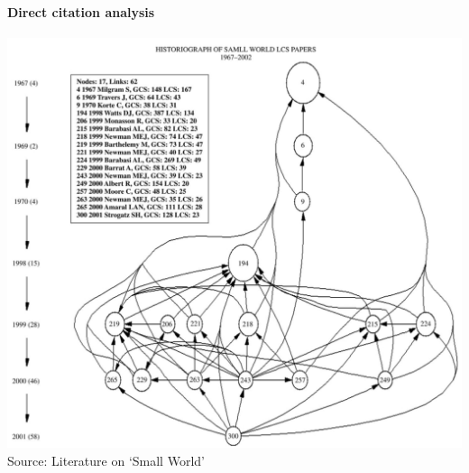 \documentclass[8pt]{beamer}
\begin{document}

\begin{frame}
\frametitle{\insertsection}
\framesubtitle{Direct citation analysis}

\centering
\includegraphics[height=0.8\textheight]{direct}\\
\tiny{Source: Literature on `Small World' \cite{Garfield2004}}

\end{frame}

\end{document}
